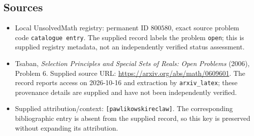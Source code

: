 \documentclass[11pt]{article}
\begin{document}
\subsection{Sources}
\begin{itemize}
\item Local UnsolvedMath registry: permanent ID \(800580\), exact source problem code \texttt{catalogue entry}. The supplied record labels the problem \texttt{open}; this is supplied registry metadata, not an independently verified status assessment.
\item Tsaban, \emph{Selection Principles and Special Sets of Reals: Open Problems} (2006), Problem 6. Supplied source URL: \url{https://arxiv.org/abs/math/0609601}. The record reports access on 2026-10-16 and extraction by \texttt{arxiv\_latex}; these provenance details are supplied and have not been independently verified.
\item Supplied attribution/context: \texttt{[pawlikowskireclaw]}. The corresponding bibliographic entry is absent from the supplied record, so this key is preserved without expanding its attribution.
\end{itemize}
\end{document}
